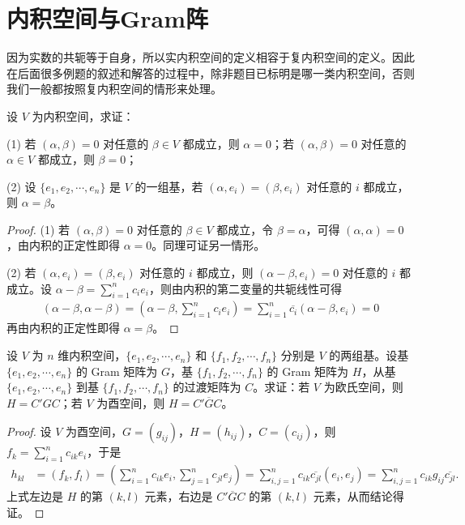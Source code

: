 \documentclass[../../main.tex]{subfiles}
\begin{document}
\section{内积空间与Gram阵}

\begin{remark}
因为实数的共轭等于自身，所以实内积空间的定义相容于复内积空间的定义。因此在后面很多例题的叙述和解答的过程中，除非题目已标明是哪一类内积空间，否则我们一般都按照复内积空间的情形来处理。
\end{remark}

\begin{proposition}\label{proposition:例9.2}
设 $V$ 为内积空间，求证：

(1) 若 $(\alpha,\beta)=0$ 对任意的 $\beta\in V$ 都成立，则 $\alpha = 0$；若 $(\alpha,\beta)=0$ 对任意的 $\alpha\in V$ 都成立，则 $\beta = 0$；

(2) 设 $\{e_1,e_2,\cdots,e_n\}$ 是 $V$ 的一组基，若 $(\alpha,e_i)=(\beta,e_i)$ 对任意的 $i$ 都成立，则 $\alpha = \beta$。
\end{proposition}
\begin{proof}
(1) 若 $(\alpha,\beta)=0$ 对任意的 $\beta\in V$ 都成立，令 $\beta = \alpha$，可得 $(\alpha,\alpha)=0$，由内积的正定性即得 $\alpha = 0$。同理可证另一情形。

(2) 若 $(\alpha,e_i)=(\beta,e_i)$ 对任意的 $i$ 都成立，则 $(\alpha - \beta,e_i)=0$ 对任意的 $i$ 都成立。设 $\alpha - \beta = \sum_{i = 1}^{n}c_ie_i$，则由内积的第二变量的共轭线性可得
\begin{align*}
(\alpha - \beta,\alpha - \beta)=(\alpha - \beta,\sum_{i = 1}^{n}c_ie_i)=\sum_{i = 1}^{n}\overline{c_i}(\alpha - \beta,e_i)=0
\end{align*}
再由内积的正定性即得 $\alpha = \beta$。

\end{proof}

\begin{proposition}\label{proposition:例9.3}
设 $V$ 为 $n$ 维内积空间，$\{e_1,e_2,\cdots,e_n\}$ 和 $\{f_1,f_2,\cdots,f_n\}$ 分别是 $V$ 的两组基。设基 $\{e_1,e_2,\cdots,e_n\}$ 的 Gram 矩阵为 $G$，基 $\{f_1,f_2,\cdots,f_n\}$ 的 Gram 矩阵为 $H$，从基 $\{e_1,e_2,\cdots,e_n\}$ 到基 $\{f_1,f_2,\cdots,f_n\}$ 的过渡矩阵为 $C$。求证：若 $V$ 为欧氏空间，则 $H = C'GC$；若 $V$ 为酉空间，则 $H = C' \overline{G}C$。
\end{proposition}
\begin{proof}
设 $V$ 为酉空间，$G = (g_{ij})$，$H = (h_{ij})$，$C = (c_{ij})$，则 $f_k = \sum_{i = 1}^{n}c_{ik}e_i$，于是
\begin{align*}
h_{kl}&=(f_k,f_l)=(\sum_{i = 1}^{n}c_{ik}e_i,\sum_{j = 1}^{n}c_{jl}e_j)=\sum_{i,j = 1}^{n}c_{ik}\overline{c_{jl}}(e_i,e_j)=\sum_{i,j = 1}^{n}c_{ik}g_{ij}\overline{c_{jl}}.
\end{align*}
上式左边是 $H$ 的第 $(k, l)$ 元素，右边是 $C' \overline{G}C$ 的第 $(k, l)$ 元素，从而结论得证。

\end{proof}
\end{document}
